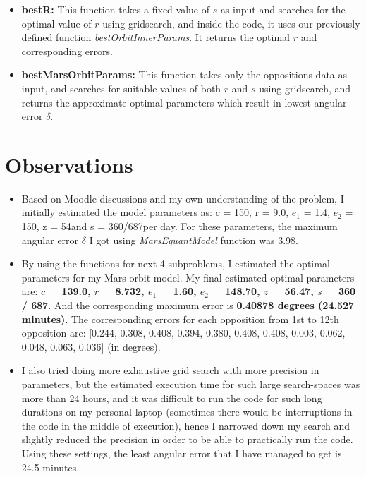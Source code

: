 \documentclass[11pt]{article}
\begin{document}
\begin{itemize}
    \item \textbf{bestR:} This function takes a fixed value of $s$ as input and searches for the optimal value of $r$ using gridsearch, and inside the code, it uses our previously defined function \emph{bestOrbitInnerParams}. It returns the optimal $r$ and corresponding errors.
    
    \item \textbf{bestMarsOrbitParams:} This function takes only the oppositions data as input, and searches for suitable values of both $r$ and $s$ using gridsearch, and returns the approximate optimal parameters which result in lowest angular error $\delta$.
\end{itemize}

\section{Observations}\label{section-observations}

\begin{itemize}
    \item Based on Moodle discussions and my own understanding of the problem, I initially estimated the model parameters as: c = 150\textdegree, r = 9.0, $e_1$ = 1.4, $e_2$ = 150\textdegree, z = 54\textdegree and s = 360/687\textdegree per day. For these parameters, the maximum angular error $\delta$ I got using \emph{MarsEquantModel} function was 3.98\textdegree.
    
    \item By using the functions for next 4 subproblems, I estimated the optimal parameters for my Mars orbit model. My final estimated optimal parameters are: \textbf{$c$ = 139.0, $r$ = 8.732, $e_1$ = 1.60, $e_2$ = 148.70, $z$ = 56.47, $s$ = 360 / 687}. And the corresponding maximum error is \textbf{0.40878 degrees (24.527 minutes)}. The corresponding errors for each opposition from 1st to 12th opposition are: [0.244, 0.308, 0.408, 0.394, 0.380, 0.408, 0.408, 0.003, 0.062, 0.048, 0.063, 0.036] (in degrees).
    
    \item I also tried doing more exhaustive grid search with more precision in parameters, but the estimated execution time for such large search-spaces was more than 24 hours, and it was difficult to run the code for such long durations on my personal laptop (sometimes there would be interruptions in the code in the middle of execution), hence I narrowed down my search and slightly reduced the precision in order to be able to practically run the code. Using these settings, the least angular error that I have managed to get is 24.5 minutes. 
\end{itemize}
\end{document}
